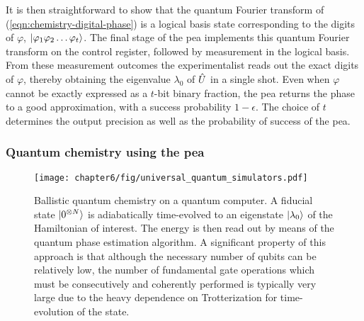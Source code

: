 It is then straightforward to show that the quantum Fourier transform of (\ref{eqn:chemistry-digital-phase}) is a logical basis state corresponding to the digits of $\varphi$, $\mbox{$ | \varphi_1\varphi_2 \ldots \varphi_t \rangle $}$. The final stage of the \gls{pea} implements this quantum Fourier transform on the control register, followed by measurement in the logical basis. From these measurement outcomes the experimentalist reads out the exact digits of $\varphi$, thereby obtaining the eigenvalue $\lambda_0$ of $\hat{U}$ in a single shot. Even when $\varphi$ cannot be exactly expressed as a $t$-bit binary fraction, the \gls{pea} returns the phase to a good approximation, with a success probability $1-\epsilon$.  The choice of $t$ determines the output precision as well as the probability of success of the \gls{pea}.


\subsubsection{Quantum chemistry using the \acrshort{pea}}

\begin{figure}[t!]
\centering
\texttt{[image: chapter6/fig/universal\_quantum\_simulators.pdf]}
\caption[Ballistic quantum chemistry on a quantum computer]{
Ballistic quantum chemistry on a quantum computer. A fiducial state $\mbox{$ | 0^{\otimes N} \rangle $}$ is adiabatically time-evolved to an eigenstate $\mbox{$ | \lambda_0 \rangle $}$ of the Hamiltonian of interest. The energy is then read out by means of the quantum phase estimation algorithm.  A significant property of this approach is that although the necessary number of qubits can be relatively low, the number of fundamental gate operations which must be consecutively and coherently performed is typically very large due to the heavy dependence on Trotterization for time-evolution of the state.}
\label{fig:chemistry-standard-approach}
\end{figure}

